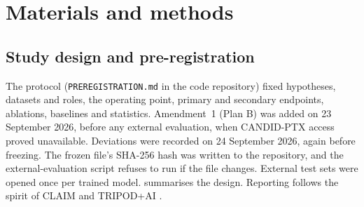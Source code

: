 \documentclass[final,3p]{elsarticle}
\begin{document}
\section{Materials and methods}
\label{sec:methods}

\subsection{Study design and pre-registration}
\label{sec:design}
The protocol (\texttt{PREREGISTRATION.md} in the code repository) fixed hypotheses, datasets and roles, the operating point, primary and secondary endpoints, ablations, baselines and statistics. Amendment~1 (Plan B) was added on 23 September 2026, before any external evaluation, when CANDID-PTX access proved unavailable. Deviations were recorded on 24 September 2026, again before freezing. The frozen file's SHA-256 hash was written to the repository, and the external-evaluation script refuses to run if the file changes. External test sets were opened once per trained model.  summarises the design. Reporting follows the spirit of CLAIM and TRIPOD+AI \citep{mongan2020claim,collins2024tripodai}.
\end{document}
